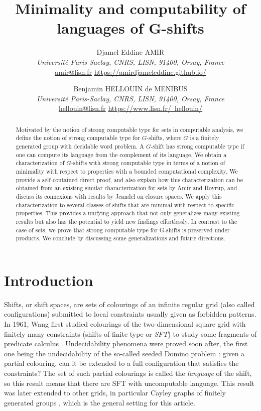 \documentclass[french,american]{article}
\author{
	Djamel Eddine AMIR \\
	\normalsize\textit{Université Paris-Saclay, CNRS, LISN, 91400, Orsay, France} \\
	\normalsize\href{mailto:amir@lisn.fr}{amir@lisn.fr} \normalsize\href{https://amirdjameleddine.github.io/}{https://amirdjameleddine.github.io/}	
	\and
	Benjamin HELLOUIN de MENIBUS \\
	\normalsize\textit{Université Paris-Saclay, CNRS, LISN, 91400, Orsay, France} \\
	\normalsize\href{mailto:hellouin@lisn.fr}{hellouin@lisn.fr} \normalsize\href{https://www.lisn.fr/~hellouin/}{https://www.lisn.fr/~hellouin/}
}
\date{}
\title{Minimality and computability of languages of G-shifts}
\theoremstyle{plain}
\theoremstyle{definition}
\theoremstyle{remark}
\theoremstyle{plain}
\begin{document}
	
	\maketitle

\begin{abstract}

Motivated by the notion of strong computable type for sets in computable
analysis, we define the notion of strong computable type for $G$-shifts,
where $G$ is a finitely generated group with decidable word problem. A
$G$-shift has strong computable type if one can compute its language from
the complement of its language.
We obtain a characterization of $G$-shifts
with strong computable type in terms of a notion of minimality with
respect to properties with a bounded computational complexity.
We provide a self-contained direct proof, and also explain how this characterization
can be obtained from an existing similar characterization for sets by Amir and Hoyrup, and discuss its connexions with results by Jeandel on closure spaces.
We apply this characterization to
several classes of shifts that are minimal with respect to specific
properties.
This provides a unifying approach that not only generalizes many
existing results but also has the potential to yield new findings
effortlessly. In contrast to the case of sets, we prove that strong
computable type for G-shifts is preserved under products. We conclude by
discussing some generalizations and future directions.
\end{abstract}



\section{Introduction}

Shifts, or shift spaces, are sets of colourings of an infinite regular grid (also called configurations) submitted to local constraints usually given as forbidden patterns. In 1961, Wang first studied colourings of the two-dimensional square grid with finitely many constraints (shifts of finite type or \emph{SFT}) to study some fragments of predicate calculus \cite{wang1961proving}. Undecidability phenomena were proved soon after, the first one being the undecidability of the so-called seeded Domino problem \cite{kahr1962entscheidungsproblem}: given a partial colouring, can it be extended to a full configuration that satisfies the constraints? The set of such partial colourings is called the \emph{language} of the shift, so this result means that there are SFT with uncomputable language. This result was later extended to other grids, in particular Cayley graphs of finitely generated groups \cite{bitar2023contributions}, which is the general setting for this article.
\end{document}
